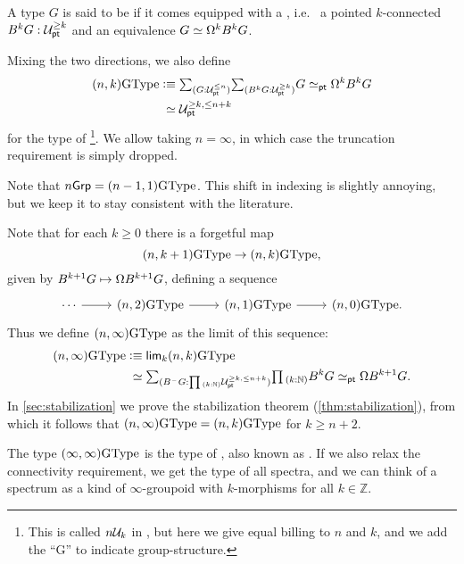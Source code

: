 \begin{defn}
A type $G$ is said to be  if it comes equipped with a , i.e.~ a pointed $k$-connected
$B^kG : \mathcal{U}_{\mathsf{pt}}^{\ge k}$ and an equivalence $G \simeq \Omega^kB^kG$.

Mixing the two directions, we also define
\begin{align*}
  (n,k)\GType
  &\defeq  \sm{G : \UU_\pt^{\le n}}{B^kG : \UU_\pt^{\ge k}}
    G \eqvsym_\pt \loopspacesym^kB^kG \\
  & \phantom{:}\eqvsym \UU_\pt^{\ge k,\le n+k}
\end{align*}
for the type of \footnote{This
  is called $n\mathcal{U}_k$ in \cite{BaezDolan1998}, but here we give equal
  billing to $n$ and $k$,
  and we add the ``G'' to indicate group-structure.}.
We allow taking $n=\infty$, in which case the truncation requirement
is simply dropped.
\end{defn}

Note that $n\mathsf{Grp} = (n-1,1)\mathrm{GType}$. This shift in indexing is slightly
annoying, but we keep it to stay consistent with the literature.

Note that for each $k\geq 0$ there is a forgetful map
\begin{equation*}
(n,k+1)\mathrm{GType} \to (n,k)\mathrm{GType},
\end{equation*}
given by $B^{k+1}G\mapsto \Omega B^{k+1}G$, defining a sequence
\begin{equation*}
\begin{tikzcd}
\cdots \arrow[r] & (n,2)\GType \arrow[r] & (n,1)\GType \arrow[r] & (n,0)\GType.
\end{tikzcd}
\end{equation*}
Thus we define $(n,\infty)\mathrm{GType}$ as the limit of this sequence:
\begin{align*}
(n,\infty)\GType & \defeq  \lim_k{}(n,k)\GType \\
&\phantom{:}\eqvsym \sm{B^{\blank}G : \prd{k : \bN}\UU_\pt^{\ge k,\le n+k}}\prd{k : \bN} B^kG \eqvsym_\pt \loopspacesym B^{k+1}G.
\end{align*}
In \cref{sec:stabilization} we prove the stabilization theorem
(\cref{thm:stabilization}), from which it follows that
$(n,\infty)\mathrm{GType}=(n,k)\mathrm{GType}$ for $k\geq n+2$.

The type $(\infty,\infty)\mathrm{GType}$ is the type of ,
also known as . If we also relax the
connectivity requirement, we get the type of all spectra, and we can
think of a spectrum as a kind of $\infty$-groupoid with $k$-morphisms
for all $k\in\mathbb{Z}$.

